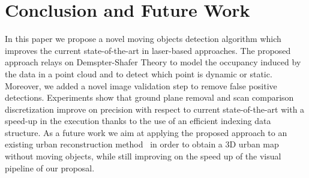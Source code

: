 \section{Conclusion and Future Work}%
\label{sec:concl}
In this paper we propose a novel moving objects detection algorithm which improves the current state-of-the-art in laser-based approaches. The proposed approach relays on Demspter-Shafer Theory to model the occupancy induced by the data in a point cloud and to detect which point is dynamic or static. Moreover, we added a novel image validation step to remove false positive detections.
Experiments show that ground plane removal and scan comparison discretization improve on precision with respect to current state-of-the-art with a speed-up in the execution thanks to the use of an efficient indexing data structure.
As a future work we aim at applying the proposed approach to an existing urban reconstruction method~\cite{romanoni2015incremental} in order to obtain a 3D urban map without moving objects, while still improving on the speed up of the visual pipeline of our proposal.


